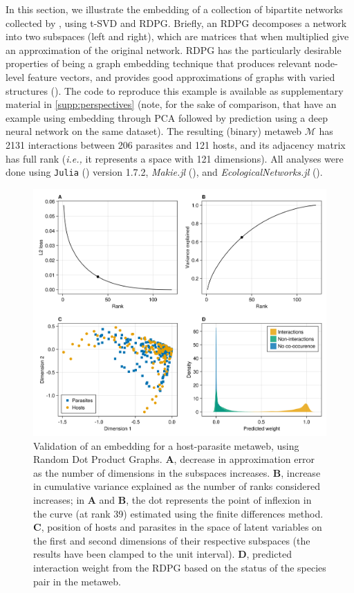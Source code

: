 \begin{refsection}
In this section, we illustrate the embedding of a collection of
bipartite networks collected by \cite{Hadfield2014TalTwo}, using t-SVD and RDPG.
Briefly, an RDPG decomposes a network into two subspaces (left and
right), which are matrices that when multiplied give an approximation of
the original network. RDPG has the particularly desirable properties of
being a graph embedding technique that produces relevant node-level
feature vectors, and provides good approximations of graphs with varied
structures (\cite{Athreya2017Statistical}). The code to reproduce this
example is available as supplementary material in \autoref{supp:perspectives} (note, for the sake of
comparison, that \cite{Strydom2021Roadmap} have an example using embedding
through PCA followed by prediction using a deep neural network on the
same dataset). The resulting (binary) metaweb \(\mathcal{M}\) has 2131
interactions between 206 parasites and 121 hosts, and its adjacency
matrix has full rank (\emph{i.e.,} it represents a space with 121
dimensions). All analyses were done using \texttt{Julia} (\cite{Bezanson2017Julia})
version 1.7.2, \emph{Makie.jl} (\cite{Danisch2021Makie}), and
\emph{EcologicalNetworks.jl} (\cite{Poisot2019EcoJl}).

\begin{figure}[h]
    \centering
    \includegraphics[width=\textwidth]{figures/illustration-part1.png}
    \caption{Validation of an embedding for a host-parasite metaweb, using
Random Dot Product Graphs. \textbf{A}, decrease in approximation error
as the number of dimensions in the subspaces increases. \textbf{B},
increase in cumulative variance explained as the number of ranks
considered increases; in \textbf{A} and \textbf{B}, the dot represents
the point of inflexion in the curve (at rank 39) estimated using the
finite differences method. \textbf{C}, position of hosts and parasites
in the space of latent variables on the first and second dimensions of
their respective subspaces (the results have been clamped to the unit
interval). \textbf{D}, predicted interaction weight from the RDPG based
on the status of the species pair in the
metaweb.}
    \label{fig:illustration1}
\end{figure}



\end{refsection}
